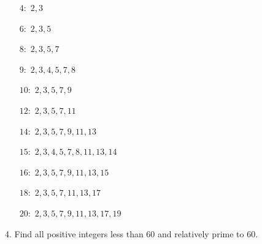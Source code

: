 \begin{mdframed}[style=darkAnswer,frametitle={Joe Starr}]
\begin{multicols}{1}
\begin{itemize}
    \item[$4:$]  {$2, 3$}
    \item[$6:$]  {$2, 3, 5$}
    \item[$8:$]  {$2, 3, 5, 7$}
    \item[$9:$]  {$2, 3, 4, 5, 7, 8$}
    \item[$10:$] {$2, 3, 5, 7, 9$}
    \item[$12:$] {$2, 3, 5, 7, 11$}
    \item[$14:$] {$2, 3, 5, 7, 9, 11, 13$}
    \item[$15:$] {$2, 3, 4, 5, 7, 8, 11, 13, 14$}
    \item[$16:$] {$2, 3, 5, 7, 9, 11, 13, 15$}
    \item[$18:$] {$2, 3, 5, 7, 11, 13, 17$}
    \item[$20:$] {$2, 3, 5, 7, 9, 11, 13, 17, 19$}
\end{itemize}
\end{multicols}
\end{mdframed}
\newpage
\begin{mdframed}[style=darkQuesion]
4. Find all positive integers less than 60 and relatively prime to $60$.
\end{mdframed}

